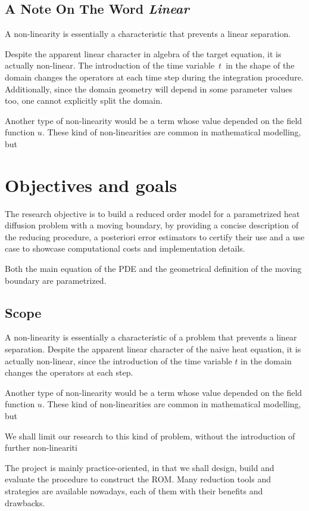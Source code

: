 \documentclass[a4paper, technote, compsoc]{IEEEtran}
\begin{document}
\subsection{A Note On The Word \textit{Linear}}
A non-linearity is essentially a characteristic that prevents a linear separation.

Despite the apparent linear character in algebra of the target equation, it is actually non-linear.
The introduction of the time variable~$t$~in the shape of the domain changes the operators at each time step during the integration procedure. 
Additionally, since the domain geometry will depend in some parameter values too, one cannot explicitly split the domain.  

Another type of non-linearity would be a term whose value depended on the field function $u$. 
These kind of non-linearities are common in mathematical modelling, but 




\section{Objectives and goals}
The research objective is to build a reduced order model for a parametrized heat diffusion problem with a moving boundary, 
by providing a concise description of the reducing procedure, 
a posteriori error estimators to certify their use and 
a use case to showcase computational costs and implementation details. 

Both the main equation of the PDE and the geometrical definition of the moving boundary are parametrized. 

\subsection{Scope}
A non-linearity is essentially a characteristic of a problem that prevents a linear separation.
Despite the apparent linear character of the naive heat equation, it is actually non-linear, since the introduction of the time variable $t$ in the domain changes the operators at each step. 

Another type of non-linearity would be a term whose value depended on the field function $u$. 
These kind of non-linearities are common in mathematical modelling, but 

We shall limit our research to this kind of problem, without the introduction of further non-lineariti

The project is mainly practice-oriented, in that we shall design, build and evaluate the procedure to construct the ROM.
Many reduction tools and strategies are available nowadays, each of them with their benefits and drawbacks. 
\end{document}
